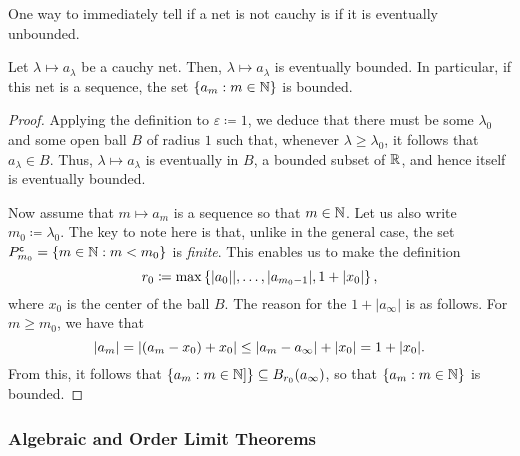 One way to immediately tell if a net is not cauchy is if it is eventually unbounded. 
\begin{prp}\label{prp3.3.28}
Let $\lambda \mapsto a_\lambda$ be a cauchy net.  Then, $\lambda \mapsto a_\lambda$ is eventually bounded.  In particular, if this net is a sequence, the set $\left\{ a_m :m\in \mathbb{N} \right\}$ is bounded.
\begin{proof}
Applying the definition to $\varepsilon \coloneqq 1$, we deduce that there must be some $\lambda _0$ and some open ball $B$ of radius $1$ such that, whenever $\lambda \geq \lambda _0$, it follows that $a_\lambda \in B$.  Thus, $\lambda \mapsto a_\lambda$ is eventually in $B$, a bounded subset of $\mathbb{R}$, and hence itself is eventually bounded.

Now assume that $m\mapsto a_m$ is a sequence so that $m\in \mathbb{N}$.  Let us also write $m_0\coloneqq \lambda _0$.  The key to note here is that, unlike in the general case, the set $P_{m_0}^{\mathsf{c}}=\{ m\in \mathbb{N} :m<m_0\}$ is \emph{finite}.  This enables us to make the definition
\begin{equation}
r_0\coloneqq \max \left\{ \lvert a_0\rvert|,\ldots ,\lvert a_{m_0-1}\rvert,1+\lvert x_0\rvert\right\} ,
\end{equation}
where $x_0$ is the center of the ball $B$.  The reason for the $1+|a_\infty|$ is as follows.  For $m\geq m_0$, we have that
\begin{equation}
\lvert a_m\rvert=\lvert(a_m-x_0)+x_0\rvert\leq \lvert a_m-a_\infty\rvert+\lvert x_0\rvert=1+\lvert x_0\rvert.
\end{equation}
From this, it follows that $\left\{ a_m:m\in \mathbb{N} ]\right\} \subseteq B_{r_0}(a_\infty)$, so that $\left\{ a_m:m\in \mathbb{N} \right\}$ is bounded.
\end{proof}
\end{prp}

\subsubsection{Algebraic and Order Limit Theorems}

